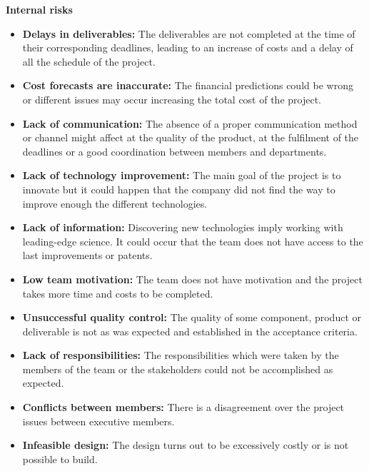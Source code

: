 \textbf{Internal risks}

\begin{itemize}
	
	\item \textbf{Delays in deliverables:} The deliverables are not completed at the time of their corresponding deadlines, leading to an increase of costs and a delay of all the schedule of the project.
	
	\item \textbf{Cost forecasts are inaccurate:} The financial predictions could be wrong or different issues may occur increasing the total cost of the project.
	
	\item \textbf{Lack of communication:} The absence of a proper communication method or channel might affect at the quality of the product, at the fulfilment of the deadlines or a good coordination between members and departments.
	
	\item \textbf{Lack of technology improvement:} The main goal of the project is to innovate but it could happen that the company did not find the way to improve enough the different technologies.
	
	\item \textbf{Lack of information:} Discovering new technologies imply working with leading-edge science. It could occur that the team does not have access to the last improvements or patents.
	
	\item \textbf{Low team motivation:} The team does not have motivation and the project takes more time and costs to be completed.
	
	\item \textbf{Unsuccessful quality control:} The quality of some component, product or deliverable is not as was expected and established in the acceptance criteria.
	
	\item \textbf{Lack of responsibilities:} The responsibilities which were taken by the members of the team or the stakeholders could not be accomplished as expected.
	
	\item \textbf{Conflicts between members:} There is a disagreement over the project issues between executive members.
	
	\item \textbf{Infeasible design:} The design turns out to be excessively costly or is not possible to build.
	

\end{itemize}
